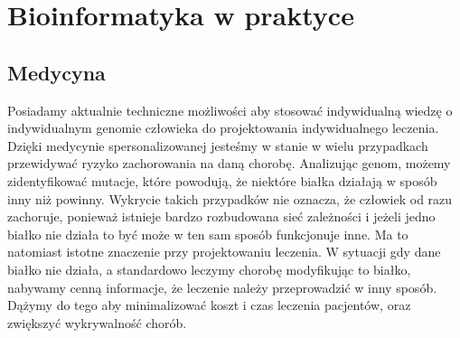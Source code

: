 \chapter{Bioinformatyka w praktyce}

\section{Medycyna}
Posiadamy aktualnie techniczne możliwości aby stosować indywidualną wiedzę o indywidualnym genomie człowieka do projektowania indywidualnego leczenia. Dzięki medycynie spersonalizowanej jesteśmy w stanie w wielu przypadkach przewidywać ryzyko zachorowania na daną chorobę. Analizując genom, możemy zidentyfikować mutacje, które powodują, że niektóre białka działają w sposób inny niż powinny. Wykrycie takich przypadków nie oznacza, że człowiek od razu zachoruje, ponieważ istnieje bardzo rozbudowana sieć zależności i jeżeli jedno białko nie działa to być może w ten sam sposób funkcjonuje inne. Ma to natomiast istotne znaczenie przy projektowaniu leczenia. W sytuacji gdy dane białko nie działa, a standardowo leczymy chorobę modyfikując to białko, nabywamy cenną informacje, że leczenie należy przeprowadzić w inny sposób. Dążymy do tego aby minimalizować koszt i czas leczenia pacjentów, oraz zwiększyć wykrywalność chorób.


